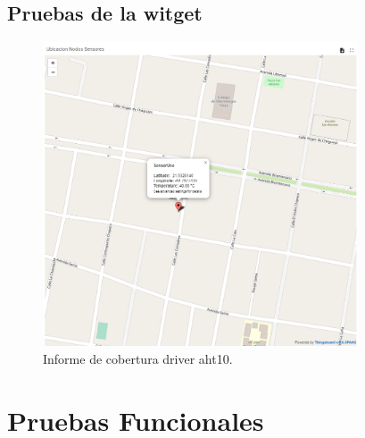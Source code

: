 \subsection{Pruebas de la witget}

\begin{figure}[h!]
  \centering
    \includegraphics[width=\linewidth, height=9cm]{./Figures/map.png}
  \caption{Informe de cobertura driver aht10.}
    \label{fig:map thingsboard}
\end{figure}


\section{Pruebas Funcionales}

\label{sec:pruebasHW}

